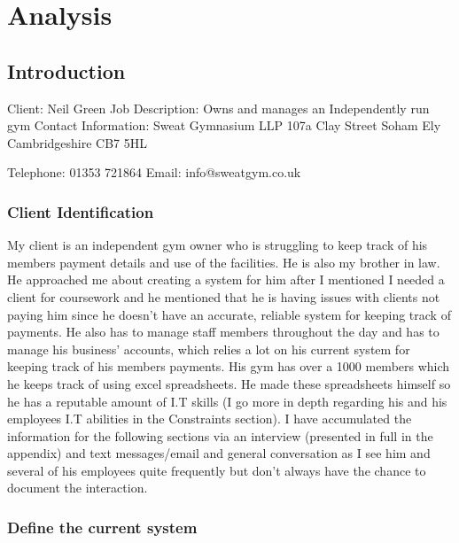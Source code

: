 \chapter{Analysis}

\section{Introduction}

Client: Neil Green
Job Description: Owns and manages an Independently run gym
Contact Information: Sweat Gymnasium LLP
					 107a Clay Street
					 Soham
					 Ely
					 Cambridgeshire
					 CB7 5HL

					 Telephone: 01353 721864
					 Email: info@sweatgym.co.uk

\subsection{Client Identification}

My client is an independent gym owner who is struggling to keep track of his members payment details and use of the facilities. He is also my brother in law. He approached me about creating a system for him after I mentioned I needed a client for coursework and he mentioned that he is having issues with clients not paying him since he doesn't have an accurate, reliable system for keeping track of payments. He also has to manage staff members throughout the day and has to manage his business' accounts, which relies a lot on his current system for keeping track of his members payments. His gym has over a 1000 members which he keeps track of using excel spreadsheets. He made these spreadsheets himself so he has a reputable amount of I.T skills (I go more in depth regarding his and his employees I.T abilities in the Constraints section). I have accumulated the information for the following sections via an interview (presented in full in the appendix) and text messages/email and general conversation as I see him and several of his employees quite frequently but don't always have the chance to document the interaction. 

\subsection{Define the current system}

